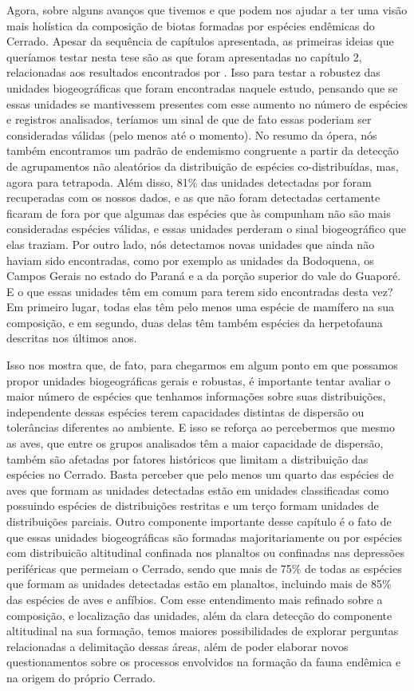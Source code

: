 \documentclass[12pt,openright,oneside,a4paper,english]{abntex2}
\begin{document}
Agora, sobre alguns avanços que tivemos e que podem nos ajudar a ter uma visão mais holística da composição de biotas formadas por espécies endêmicas do Cerrado. Apesar da sequência de capítulos apresentada, as primeiras ideias que queríamos testar nesta tese são as que foram apresentadas no capítulo 2, relacionadas aos resultados encontrados por \citet{Azevedo2016}. Isso para testar a robustez das unidades biogeográficas que foram encontradas naquele estudo, pensando que se essas unidades se mantivessem presentes com esse aumento no número de espécies e registros analisados, teríamos um sinal de que de fato essas poderiam ser consideradas válidas (pelo menos até o momento). No resumo da ópera, nós também encontramos um padrão de endemismo congruente a partir da detecção de agrupamentos não aleatórios da distribuição de espécies co-distribuídas, mas, agora para tetrapoda. Além disso, 81\% das unidades detectadas por \citep{Azevedo2016} foram recuperadas com os nossos dados, e as que não foram detectadas certamente ficaram de fora por que algumas das espécies que às compunham não são mais consideradas espécies válidas, e essas unidades perderam o sinal biogeográfico que elas traziam. Por outro lado, nós detectamos novas unidades que ainda não haviam sido encontradas, como por exemplo as unidades da Bodoquena, os Campos Gerais no estado do Paraná e a da porção superior do vale do Guaporé. E o que essas unidades têm em comum para terem sido encontradas desta vez? Em primeiro lugar, todas elas têm pelo menos uma espécie de mamífero na sua composição, e em segundo, duas delas têm também espécies da herpetofauna descritas nos últimos anos. 

Isso nos mostra que, de fato, para chegarmos em algum ponto em que possamos propor unidades biogeográficas gerais e robustas, é importante tentar avaliar o maior número de espécies que tenhamos informações sobre suas distribuições, independente dessas espécies terem capacidades distintas de dispersão ou tolerâncias diferentes ao ambiente. E isso se reforça ao percebermos que mesmo as aves, que entre os grupos analisados têm a maior capacidade de dispersão, também são afetadas por fatores históricos que limitam a distribuição das espécies no Cerrado. Basta perceber que pelo menos um quarto das espécies de aves que formam as unidades detectadas estão em unidades classificadas como possuindo espécies de distribuições restritas e um terço formam unidades de distribuições parciais. Outro componente importante desse capítulo é o fato de que essas unidades biogeográficas são formadas majoritariamente ou por espécies com distribuicão altitudinal confinada nos planaltos ou confinadas nas depressões periféricas que permeiam o Cerrado, sendo que mais de 75\% de todas as espécies que formam as unidades detectadas estão em planaltos, incluindo mais de 85\% das espécies de aves e anfíbios. Com esse entendimento mais refinado sobre a composição, e localização das unidades, além da clara detecção do componente altitudinal na sua formação, temos maiores possibilidades de explorar perguntas relacionadas a delimitação dessas áreas, além de poder elaborar novos questionamentos sobre os processos envolvidos na formação da fauna endêmica e na origem do próprio Cerrado.
\end{document}

